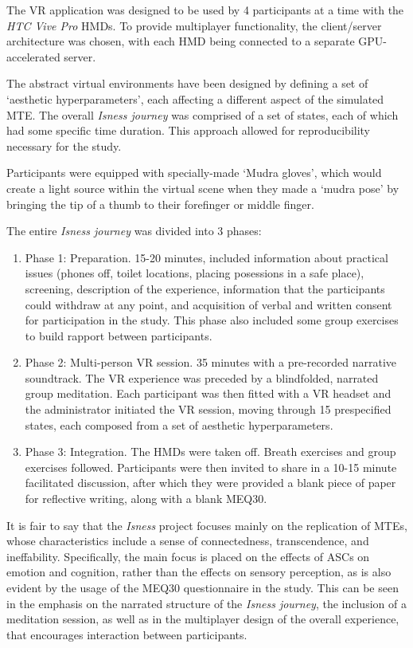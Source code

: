 The \ac{VR} application was designed to be used by 4 participants at a time with the \textit{HTC Vive Pro} \acp{HMD}. To provide multiplayer functionality, the client/server architecture was chosen, with each \ac{HMD} being connected to a separate \acs{GPU}-accelerated server.

The abstract virtual environments have been designed by defining a set of `aesthetic hyperparameters', each affecting a different aspect of the simulated \ac{MTE}. The overall \textit{Isness journey} was comprised of a set of states, each of which had some specific time duration. This approach allowed for reproducibility necessary for the study.

Participants were equipped with specially-made `Mudra gloves', which would create a light source within the virtual scene when they made a `mudra pose' by bringing the tip of a thumb to their forefinger or middle finger.

The entire \textit{Isness journey} was divided into 3 phases:

\begin{enumerate}
    \item Phase 1: Preparation. 15-20 minutes, included information about practical issues (phones off, toilet locations, placing posessions in a safe place), screening, description of the experience, information that the participants could withdraw at any point, and acquisition of verbal and written consent for participation in the study. This phase also included some group exercises to build rapport between participants.
    \item Phase 2: Multi-person \ac{VR} session. 35 minutes with a pre-recorded narrative soundtrack. The \ac{VR} experience was preceded by a blindfolded, narrated group meditation. Each participant was then fitted with a VR headset and the administrator initiated the \ac{VR} session, moving through 15 prespecified states, each composed from a set of aesthetic hyperparameters.
    \item Phase 3: Integration. The \acp{HMD} were taken off. Breath exercises and group exercises followed. Participants were then invited to share in a 10-15 minute facilitated discussion, after which they were provided a blank piece of paper for reflective writing, along with a blank \ac{MEQ30}.
\end{enumerate}

It is fair to say that the \textit{Isness} project focuses mainly on the replication of \acp{MTE}, whose characteristics include a sense of connectedness, transcendence, and ineffability. Specifically, the main focus is placed on the effects of \acp{ASC} on emotion and cognition, rather than the effects on sensory perception, as is also evident by the usage of the \ac{MEQ30} questionnaire in the study. This can be seen in the emphasis on the narrated structure of the \textit{Isness journey}, the inclusion of a meditation session, as well as in the multiplayer design of the overall experience, that encourages interaction between participants.

